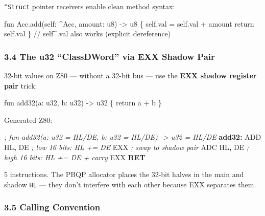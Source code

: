 \documentclass[
  11pt,
]{article}
\newenvironment{Shaded}{\begin{snugshade}}{\end{snugshade}}
\newcommand{\BuiltInTok}[1]{#1}
\newcommand{\CommentTok}[1]{\textcolor[rgb]{0.56,0.35,0.01}{\textit{#1}}}
\newcommand{\ControlFlowTok}[1]{\textcolor[rgb]{0.13,0.29,0.53}{\textbf{#1}}}
\newcommand{\FunctionTok}[1]{\textcolor[rgb]{0.13,0.29,0.53}{\textbf{#1}}}
\newcommand{\NormalTok}[1]{#1}
\newcommand{\OperatorTok}[1]{\textcolor[rgb]{0.81,0.36,0.00}{\textbf{#1}}}
\begin{document}
\texttt{\^{}Struct} pointer receivers enable clean method syntax:

\begin{Shaded}
\begin{Highlighting}[]
\NormalTok{fun Acc.add(self: \^{}Acc, amount: u8) {-}\textgreater{} u8 \{}
\NormalTok{    self.val = self.val + amount}
\NormalTok{    return self.val}
\NormalTok{\}}
\NormalTok{// self\^{}.val also works (explicit dereference)}
\end{Highlighting}
\end{Shaded}

\hypertarget{the-u32-classdword-via-exx-shadow-pair}{%
\subsubsection{3.4 The u32 ``ClassDWord'' via EXX Shadow
Pair}\label{the-u32-classdword-via-exx-shadow-pair}}

32-bit values on Z80 --- without a 32-bit bus --- use the \textbf{EXX
shadow register pair} trick:

\begin{Shaded}
\begin{Highlighting}[]
\NormalTok{fun add32(a: u32, b: u32) {-}\textgreater{} u32 \{ return a + b \}}
\end{Highlighting}
\end{Shaded}

Generated Z80:

\begin{Shaded}
\begin{Highlighting}[]
\CommentTok{; fun add32(a: u32 = HL/DE\textquotesingle{}, b: u32 = HL\textquotesingle{}/DE) {-}\textgreater{} u32 = HL/DE}
\FunctionTok{add32:}
    \BuiltInTok{ADD}\NormalTok{ HL}\OperatorTok{,}\NormalTok{ DE      }\CommentTok{; low 16 bits: HL += DE}
\NormalTok{    EXX             }\CommentTok{; swap to shadow pair}
    \BuiltInTok{ADC}\NormalTok{ HL}\OperatorTok{,}\NormalTok{ DE      }\CommentTok{; high 16 bits: HL\textquotesingle{} += DE\textquotesingle{} + carry}
\NormalTok{    EXX}
    \ControlFlowTok{RET}
\end{Highlighting}
\end{Shaded}

5 instructions. The PBQP allocator places the 32-bit halves in the main
and shadow \texttt{HL} --- they don't interfere with each other because
EXX separates them.

\hypertarget{calling-convention}{%
\subsubsection{3.5 Calling Convention}\label{calling-convention}}
\end{document}
